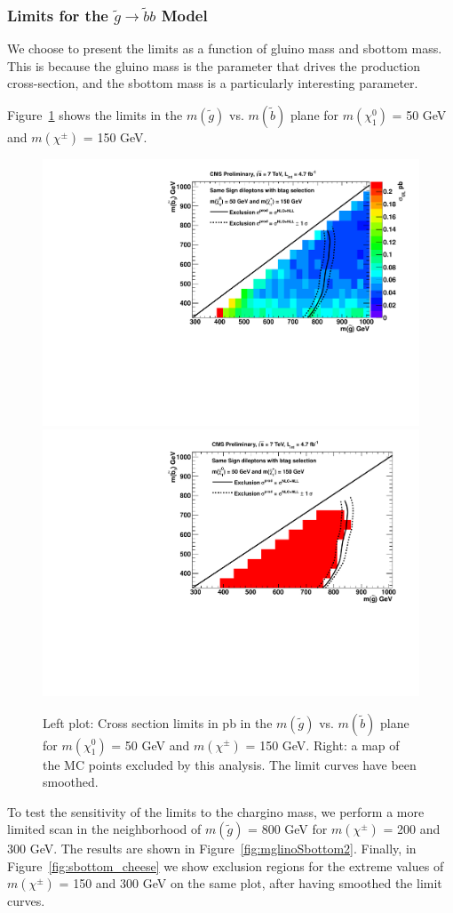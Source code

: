\subsubsection{Limits for the $\widetilde{g} \to \widetilde{b}b$ Model}
\label{sec:gbblimits}

We choose to present the limits as a function of gluino mass and
sbottom mass.  This is because the gluino mass is the parameter
that drives the production cross-section, and the sbottom mass
is a particularly interesting parameter.

Figure~\ref{fig:mglinoSbottom} shows the limits in 
the $m(\widetilde{g})$ vs. 
$m(\widetilde{b})$ plane
for $m(\chi_1^0)$ = 50 GeV and 
$m(\chi^{\pm})$ = 150 GeV. 



\begin{figure}[htb]
\begin{center}
\includegraphics[width=0.49\linewidth]{figs/B2_LimitsOnCarpet_150.pdf}
\includegraphics[width=0.49\linewidth]{figs/B2_ExcludedRegionMap_150.pdf}
\caption{Left plot: Cross section limits in pb in the $m(\widetilde{g})$ vs. 
$m(\widetilde{b})$ plane
for $m(\chi_1^0)$ = 50 GeV and 
$m(\chi^{\pm})$ = 150 GeV.
Right: a map of the MC points excluded by this analysis.
The limit curves have been smoothed.
\label{fig:mglinoSbottom}}
\end{center}
\end{figure}

To test the sensitivity of the limits to the chargino mass, 
we perform a more limited scan in the neighborhood of 
$m(\widetilde{g})$ = 800 GeV for $m(\chi^{\pm})$ = 200 and 
300 GeV.  The results are shown in Figure~\ref{fig:mglinoSbottom2}.
Finally, in Figure~\ref{fig:sbottom_cheese} we show exclusion
regions for the extreme values of 
$m(\chi^{\pm})$ = 150 and 300 GeV on the same plot, after 
having smoothed the limit curves.

